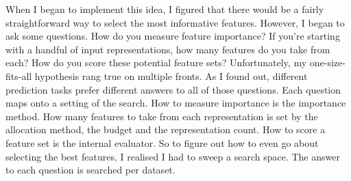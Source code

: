 
When I began to implement this idea, I figured that there would be a fairly straightforward way to select the most informative features. However, I began to ask some questions. How do you measure feature importance? If you're starting with a handful of input representations, how many features do you take from each? How do you score these potential feature sets? Unfortunately, my one-size-fits-all hypothesis rang true on multiple fronts. As I found out, different prediction tasks prefer different answers to all of those questions. Each question maps onto a setting of the search. How to measure importance is the importance method. How many features to take from each representation is set by the allocation method, the budget and the representation count. How to score a feature set is the internal evaluator. So to figure out how to even go about selecting the best features, I realised I had to sweep a search space. The answer to each question is searched per dataset.

